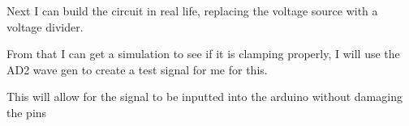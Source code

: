 \documentclass{article}
\begin{document}
Next I can build the circuit in real life, replacing the voltage source with a voltage divider.
\begin{center}
\end{center}
From that I can get a simulation to see if it is clamping properly, I will use the AD2 wave  gen to create a test signal for me for this.
\begin{center}
\end{center}
This will allow for the signal to be inputted into the arduino without damaging the pins
\newpage
\end{document}
